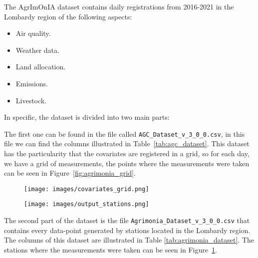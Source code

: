 \documentclass[11pt,a4paper]{article}
\begin{document}
The AgrImOnIA dataset contains daily registrations from 2016-2021 in the Lombardy region of the following aspects:

\begin{itemize}
    \item Air quality.
    \item Weather data.
    \item Land allocation.
    \item Emissions.
    \item Livestock.
\end{itemize}

In specific, the dataset is divided into two main parts:

The first one can be found in the file called \texttt{AGC\_Dataset\_v\_3\_0\_0.csv}, in this file we can find the columns illustrated in Table~\ref{tab:agc_dataset}. This dataset has the particularity that the covariates are registered in a grid, so for each day, we have a grid of measurements, the points where the measurements were taken can be seen in Figure~\ref{fig:agrimonia_grid}.

\begin{figure} [H]
    \begin{minipage}{0.5\textwidth}
        \centering
        \texttt{[image: images/covariates\_grid.png]}
        \label{fig:agrimonia_grid}
    \end{minipage}
    \begin{minipage}{0.5\textwidth}
        \centering
        \texttt{[image: images/output\_stations.png]}
        \captionsetup{format=hang}
        \label{fig:agrimonia_stations}
    \end{minipage}
\end{figure}


The second part of the dataset is the file \texttt{Agrimonia\_Dataset\_v\_3\_0\_0.csv} that contains every data-point generated by stations located in the Lombardy region. The columns of this dataset are illustrated in Table \ref{tab:agrimonia_dataset}. The stations where the measurements were taken can be seen in Figure~\ref{fig:agrimonia_stations}.
\end{document}
